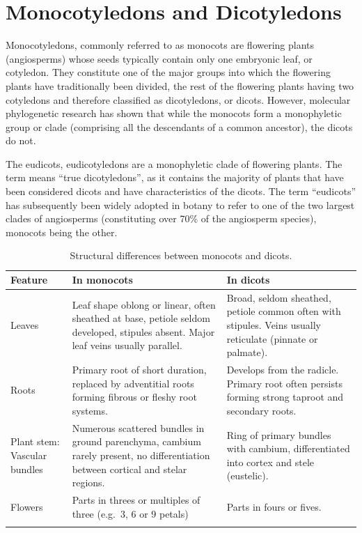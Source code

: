 \section{Monocotyledons and
Dicotyledons}\label{monocotyledons-and-dicotyledons}

Monocotyledons, commonly referred to as monocots are flowering plants
(angiosperms) whose seeds typically contain only one embryonic leaf, or
cotyledon. They constitute one of the major groups into which the
flowering plants have traditionally been divided, the rest of the
flowering plants having two cotyledons and therefore classified as
dicotyledons, or dicots. However, molecular phylogenetic research has
shown that while the monocots form a monophyletic group or clade
(comprising all the descendants of a common ancestor), the dicots do
not.

The eudicots, eudicotyledons are a monophyletic clade of flowering
plants. The term means ``true dicotyledons'', as it contains the
majority of plants that have been considered dicots and have
characteristics of the dicots. The term ``eudicots'' has subsequently
been widely adopted in botany to refer to one of the two largest clades
of angiosperms (constituting over 70\% of the angiosperm species),
monocots being the other.

\begin{table}[h!]
\centering
\caption{Structural differences between monocots and
dicots.}\label{tab:moncots}
\begin{tabularx}{\columnwidth}{YYY} \\
\toprule
Feature & In monocots & In dicots \\
\midrule
Leaves &
Leaf shape oblong or linear, often sheathed at base, petiole seldom
developed, stipules absent. Major leaf veins usually parallel. &
Broad, seldom sheathed, petiole common often with stipules. Veins
usually reticulate (pinnate or palmate).\\
Roots &
Primary root of short duration, replaced by adventitial roots forming
fibrous or fleshy root systems. &
Develops from the radicle. Primary root often persists forming strong
taproot and secondary roots. \\
Plant stem: Vascular bundles &
Numerous scattered bundles in ground parenchyma, cambium rarely present,
no differentiation between cortical and stelar regions. & Ring of primary bundles with cambium, differentiated into cortex and
stele (eustelic).\\
Flowers & Parts in threes or multiples of three (e.g.~3, 6 or 9 petals) & Parts in fours or fives.\\
\bottomrule \\
\end{tabularx}
\end{table}

